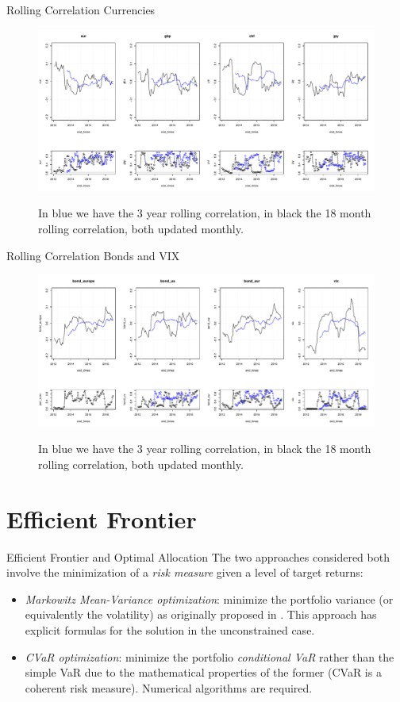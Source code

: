 \documentclass{beamer}
\begin{document}
\begin{frame}{Rolling Correlation Currencies}
\begin{figure}
\includegraphics[width=\textwidth]{rolling_fx.pdf}
\label{roll_fx}
\caption{In blue we have the 3 year rolling correlation, in black the 18 month rolling correlation, both updated monthly.}
\end{figure}
\end{frame}

\begin{frame}{Rolling Correlation Bonds and VIX}
\begin{figure}
\includegraphics[width=\textwidth]{rolling_bonds.pdf}
\label{roll_bonds}
\caption{In blue we have the 3 year rolling correlation, in black the 18 month rolling correlation, both updated monthly.}
\end{figure}
\end{frame}

\section{Efficient Frontier}

\begin{frame}{Efficient  Frontier and Optimal Allocation}
The two approaches considered both involve the minimization of a \textit{risk measure} given a level of target returns:
\begin{itemize}
	\item \textit{Markowitz Mean-Variance optimization}:  minimize the portfolio variance (or equivalently the volatility) as originally proposed in \cite{MARKOWITZ}. This approach has explicit formulas for the solution in the unconstrained case.
	\item \textit{CVaR optimization}: minimize the portfolio \textit{conditional VaR} rather than the simple VaR due to the mathematical properties of the former (CVaR is a coherent risk measure). Numerical algorithms are required.
\end{itemize}
\end{frame}
\end{document}
